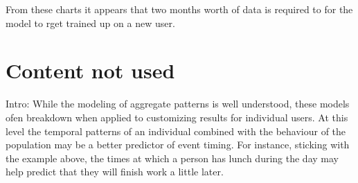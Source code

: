 From these charts it appears that two months worth of data is required to for the model to rget trained up on a new user.


\section{Content not used} %

Intro:
While the modeling of aggregate patterns is well understood, these models ofen breakdown when applied to customizing results for individual users. At this level the temporal patterns of an individual combined with the behaviour of the population may be a better predictor of event timing. For instance, sticking with the example above, the times at which a person has lunch during the day may help predict that they will finish work a little later.

